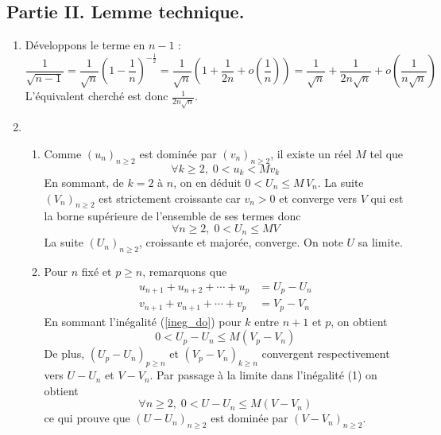 \subsection*{Partie II. Lemme technique.}
\begin{enumerate}
  \item D{\'e}veloppons le terme en $n-1$ :
\begin{displaymath}
\frac{1}{\sqrt{n-1}} = \frac{1}{\sqrt{n}}(1-\frac{1}{n})^{-\frac{1}{2}}
  = \frac{1}{\sqrt{n}}\left(1+\frac{1}{2n}+o(\frac{1}{n})\right)
  = \frac{1}{\sqrt{n}}+\frac{1}{2n\sqrt{n}}+o(\frac{1}{n\sqrt{n}})
\end{displaymath}
  L'{\'e}quivalent cherch{\'e} est donc $\frac{1}{2n\sqrt{n}}$.

  \item 
  \begin{enumerate}
 \item Comme $(u_n)_{n\geq 2}$ est domin{\'e}e par $(v_n)_{n\geq 2}$, il existe un r{\'e}el $M$ tel que 
\begin{equation}
  \forall k\geq 2,\; 0 < u_k < M v_k \label{ineg_do}
\end{equation}
En sommant, de $k=2$ à $n$, on en d{\'e}duit $ 0 < U_n \leq M \,V_n$. \newline
La suite $(V_n)_{n\geq 2}$ est strictement croissante car $v_n > 0$ et converge vers $V$ qui est la borne sup{\'e}rieure de l'ensemble de ses termes donc
\begin{displaymath}
  \forall n\geq2,\; 0< U_n \leq M V
\end{displaymath}
La suite $(U_n)_{n\geq 2}$, croissante et major{\'e}e, converge. On note $U$ sa limite.
     \item Pour $n$ fix{\'e} et $p\geq n$, remarquons que
\begin{align*}
     u_{n+1}+u_{n+2}+\cdots+u_p &= U_p-U_{n}\\
     v_{n+1}+v_{n+1}+\cdots+v_p &= V_p-V_{n}
\end{align*}
En sommant l'inégalité (\ref{ineg_do}) pour $k$ entre $n+1$ et $p$, on obtient
\begin{displaymath}
      0 < U_p - U_n \leq M (V_p-V_n)
\end{displaymath}
De plus, $(U_p-U_n)_{p\geq n}$ et $(V_p-V_n)_{k\geq n}$ convergent respectivement vers $U-U_n$ et $V-V_n$.
Par passage {\`a} la limite dans l'in{\'e}galit{\'e} (1) on obtient
\begin{displaymath}
\forall n\geq 2,\;  0< U - U_n \leq M(V-V_n)
\end{displaymath}
ce qui prouve que $(U-U_n)_{n\geq 2}$ est domin{\'e}e par $(V-V_n)_{n\geq 2}$.
\end{enumerate}


\end{enumerate}
